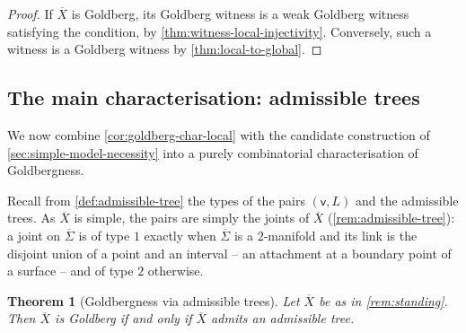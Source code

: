 \documentclass[reqno]{amsart}
\newtheorem{theorem}{Theorem}[section]
\theoremstyle{definition}
\newcommand\sfv{\mathsf{v}}
\renewcommand{\bar}{\overline}
\numberwithin{equation}{section}
\begin{document}
\begin{proof}
If \(\bar X\) is Goldberg, its Goldberg witness is a weak
Goldberg witness satisfying the condition, by
\cref{thm:witness-local-injectivity}. Conversely, such a
witness is a Goldberg witness by \cref{thm:local-to-global}.
\end{proof}

\subsection{The main characterisation: admissible trees}
\label{ssec:admissible-trees}

We now combine \cref{cor:goldberg-char-local} with the candidate
construction of \cref{sec:simple-model-necessity} into a purely
combinatorial characterisation of Goldbergness.

Recall from \cref{def:admissible-tree} the types of the
pairs \((\sfv,L)\) and the admissible trees. As
\(\bar X\) is simple, the pairs are simply the joints of
\(\bar X\) (\cref{rem:admissible-tree}): a joint on
\(\bar\Sigma\) is of type \(1\) exactly when \(\bar\Sigma\) is
a \(2\)-manifold and its link is the disjoint union of a point
and an interval -- an attachment at a boundary point of a
surface -- and of type \(2\) otherwise.

\begin{theorem}[Goldbergness via admissible trees]
\label{thm:goldberg-char-trees}
Let \(\bar X\) be as in \cref{rem:standing}. Then \(\bar X\)
is Goldberg if
and only if \(\bar X\) admits an admissible tree.
\end{theorem}
\end{document}
